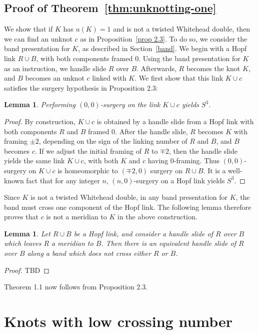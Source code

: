 \documentclass[11pt,usenames,dvipsnames,reqno]{amsart}
\numberwithin{theorem}{section}
\newtheorem{lemma}[theorem]{Lemma}
\theoremstyle{ex}
\theoremstyle{rem}
\begin{document}
\subsection{Proof of Theorem~\ref{thm:unknotting-one}} We show that if $K$ has $u(K)=1$ and is not a twisted Whitehead double, then we can find an unknot $c$ as in Proposition~\ref{prop 2.3}. To do so, we consider the band presentation for $K$, as described in Section~\ref{band}. We begin with a Hopf link $R\cup B$, with both components framed 0. Using the band presentation for $K$ as an instruction, we handle slide $R$ over $B$. Afterwards, $R$ becomes the knot $K$, and $B$ becomes an unknot $c$ linked with $K$. We first show that this link $K\cup c$ satisfies the surgery hypothesis in Proposition 2.3:

\begin{lemma}
	Performing $(0,0)$-surgery on the link $K\cup c$ yields $S^3$.
\end{lemma}

\begin{proof}
	By construction, $K\cup c$ is obtained by a handle slide from a Hopf link with both components $R$ and $B$ framed 0. After the handle slide, $R$ becomes $K$ with framing $\pm 2$, depending on the sign of the linking number of $R$ and $B$, and $B$ becomes $c$. If we adjust the initial framing of $R$ to $\mp 2$, then the handle slide yields the same link $K\cup c$, with both $K$ and $c$ having 0-framing. Thus $(0,0)$-surgery on $K\cup c$ is homeomorphic to $(\mp 2,0)$ surgery on $R\cup B$. It is a well-known fact that for any integer $n$, $(n,0)$-surgery on a Hopf link yields $S^3$.
\end{proof}

Since $K$ is not a twisted Whitehead double, in any band presentation for $K$, the band must cross one component of the Hopf link. The following lemma therefore proves that $c$ is not a meridian to $K$ in the above construction.

\begin{lemma}
	Let $R\cup B$ be a Hopf link, and consider a handle slide of $R$ over $B$ which leaves $R$ a meridian to $B$. Then there is an equivalent handle slide of $R$ over $B$ along a band which does not cross either $R$ or $B$.
\end{lemma}
\begin{proof}
	TBD
\end{proof}

Theorem 1.1 now follows from Proposition 2.3.

\section{Knots with low crossing number}
\end{document}
